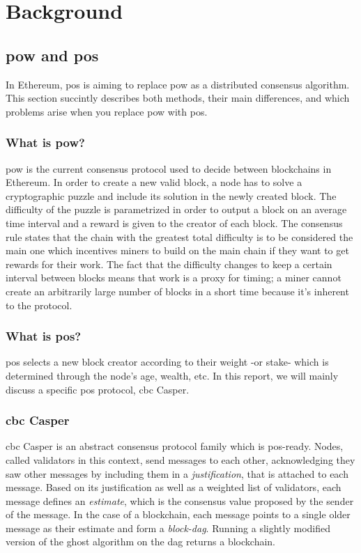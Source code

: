 \chapter{Background}
\label{chap:background}

\section{\gls{pow} and \gls{pos}}
In Ethereum, \gls{pos} is aiming to replace \gls{pow} as a distributed consensus
algorithm. This section succintly describes both methods, their main
differences, and which problems arise when you replace \gls{pow} with \gls{pos}.

\subsection{What is \gls{pow}?}
\gls{pow} is the current consensus protocol used to decide between blockchains
in Ethereum. In order to create a new valid block, a node has to solve a
cryptographic puzzle and include its solution in the newly created block. The
difficulty of the puzzle is parametrized in order to output a block on an
average time interval and a reward is given to the creator of each block.  The
consensus rule states that the chain with the greatest total difficulty is to be
considered the main one which incentives miners to build on the main chain if
they want to get rewards for their work. The fact that the difficulty changes to
keep a certain interval between blocks means that work is a proxy for timing; a
miner cannot create an arbitrarily large number of blocks in a short time
because it's inherent to the protocol.


\subsection{What is \gls{pos}?}
\gls{pos} selects a new block creator according to their weight -or stake- which
is determined through the node's age, wealth, etc. In this report, we will
mainly discuss a specific \gls{pos} protocol, \gls{cbc} Casper.

\subsection{\gls{cbc} Casper}
\label{ssec:cbc}
\FloatBarrier
\gls{cbc} Casper \cite{abstractCBC} \cite{abstractCBC2} is an abstract consensus
protocol family which is \gls{pos}-ready. Nodes, called validators in this
context, send messages to each other, acknowledging they saw other messages by
including them in a \textit{justification}, that is attached to each message.
Based on its justification as well as a weighted list of validators, each
message defines an \textit{estimate}, which is the consensus value proposed by
the sender of the message. In the case of a blockchain, each message points to a
single older message as their estimate and form a \textit{block-\gls{dag}}. Running
a slightly modified version of the \gls{ghost} algorithm on the \gls{dag}
\cite{abstractCBC} \cite{GHOST} returns a blockchain.

